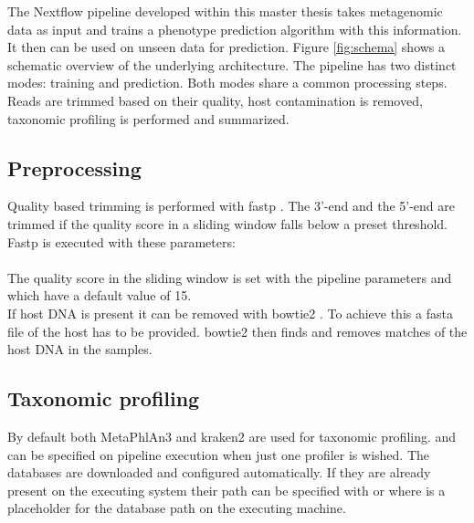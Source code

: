 The Nextflow pipeline developed within this master thesis takes metagenomic data as input and trains a phenotype prediction algorithm with this information. It then can be used on unseen data for prediction.
Figure \ref{fig:schema} shows a schematic overview of the underlying architecture. 
The pipeline has two distinct modes: training and prediction. Both modes share a common processing steps. Reads are trimmed based on their quality, host contamination is removed, taxonomic profiling is performed and summarized.


\subsection{Preprocessing}
Quality based trimming is performed with fastp \citep{fastp}. The 3'-end and the 5'-end are trimmed if the quality score in a sliding window falls below a preset threshold. Fastp is executed with these parameters:
\\
\\
The quality score in the sliding window is set with the pipeline parameters  and  which have a default value of 15.\\


If host DNA is present it can be removed with bowtie2 \citep{bowtie2}.
To achieve this a fasta file of the host has to be provided. bowtie2 then finds and removes matches of the host DNA in the samples.

\subsection{Taxonomic profiling}
By default both MetaPhlAn3 and kraken2 are used for taxonomic profiling. 
 and  can be specified on pipeline execution when just one profiler is wished.
The databases are downloaded and configured automatically. If they are already present on the executing system their path can be specified with  or  where  is a placeholder for the database path on the executing machine.

